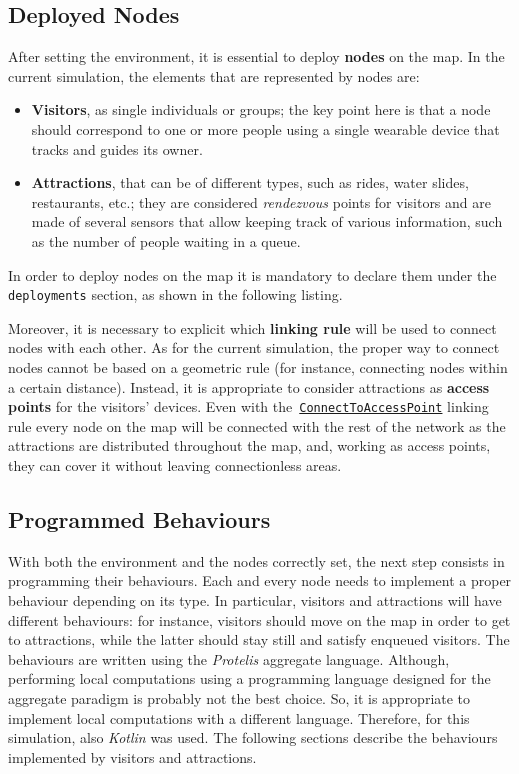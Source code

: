 \subsection{Deployed Nodes}\label{subsec:deployed-nodes}
After setting the environment, it is essential to deploy \textbf{nodes} on the map.
In the current simulation, the elements that are represented by nodes are:
\begin{itemize}
    \item \textbf{Visitors}, as single individuals or groups;
    the key point here is that a node should correspond to one or more people using a single wearable device that tracks and guides its owner.
    \item \textbf{Attractions}, that can be of different types, such as rides, water slides, restaurants, etc.; they are considered \textit{rendezvous} points for visitors and are made of several sensors that allow keeping track of various information, such as the number of people waiting in a queue.
\end{itemize}

\noindent
In order to deploy nodes on the map it is mandatory to declare them under the \texttt{deployments} section, as shown in the following listing.



\noindent
Moreover, it is necessary to explicit which \textbf{linking rule} will be used to connect nodes with each other.
As for the current simulation, the proper way to connect nodes cannot be based on a geometric rule (for instance, connecting nodes within a certain distance).
Instead, it is appropriate to consider attractions as \textbf{access points} for the visitors' devices.
Even with the~\href{https://alchemistsimulator.github.io/reference/kdoc/alchemist/it.unibo.alchemist.model.implementations.linkingrules/-connect-to-access-point/index.html}{\texttt{ConnectToAccessPoint}} linking rule every node on the map will be connected with the rest of the network as the attractions are distributed throughout the map, and, working as access points, they can cover it without leaving connectionless areas.



\subsection{Programmed Behaviours}
With both the environment and the nodes correctly set, the next step consists in programming their behaviours.
Each and every node needs to implement a proper behaviour depending on its type.
In particular, visitors and attractions will have different behaviours: for instance, visitors should move on the map in order to get to attractions, while the latter should stay still and satisfy enqueued visitors.
The behaviours are written using the \textit{Protelis} aggregate language.
Although, performing local computations using a programming language designed for the aggregate paradigm is probably not the best choice.
So, it is appropriate to implement local computations with a different language.
Therefore, for this simulation, also \textit{Kotlin} was used.
The following sections describe the behaviours implemented by visitors and attractions.

